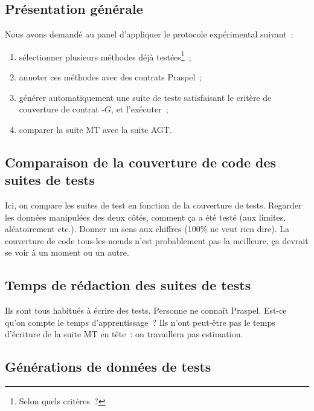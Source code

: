 \subsection{Présentation générale}

Nous avons demandé au panel d'appliquer le protocole expérimental suivant~:

\begin{enumerate}

\item sélectionner plusieurs méthodes déjà testées\footnote{Selon quels
critères~?}~;

\item annoter ces méthodes avec des contrats Praspel~;

\item générer automatiquement une suite de tests satisfaisant le critère de
couverture de contrat -$G$, et l'exécuter~;

\item comparer la suite MT avec la suite AGT.

\end{enumerate}


\subsection{Comparaison de la couverture de code des suites de tests}

Ici, on compare les suites de test en fonction de la couverture de tests.
Regarder les données manipulées des deux côtés, comment ça a été testé (aux
limites, aléatoirement etc.). Donner un sens aux chiffres (100\% ne veut rien
dire). La couverture de code tous-les-nœuds n'est probablement pas la meilleure,
ça devrait se voir à un moment ou un autre.

\subsection{Temps de rédaction des suites de tests}

Ils sont tous habitués à écrire des tests. Personne ne connaît Praspel. Est-ce
qu'on compte le temps d'apprentissage~? Ils n'ont peut-être pas le temps
d'écriture de la suite MT en tête~: on travaillera pas estimation.

\subsection{Générations de données de tests}

